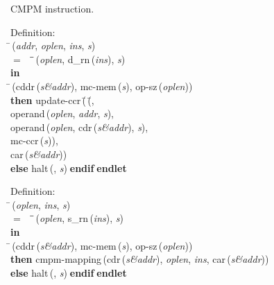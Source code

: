  CMPM instruction.
\begin{tabbing}{\sc Definition}: \\  
\=\,({\it{addr\/}}, {\it{oplen\/}}, {\it{ins\/}}, {\it{s\/}}) \\ 
$=$$\;\;\;\;$\=\=\,({\it{oplen\/}}, {\rm{d\_rn}}\,({\it{ins\/}}), {\it{s\/}})\- \\ 
{\bf in} \\ 
\=\,({\rm{cddr}}\,({\it{s\&addr\/}}), {\rm{mc-mem}}\,({\it{s\/}}), {\rm{op-sz}}\,({\it{oplen\/}})) \\ 
{\bf then }{\rm{update-ccr}}\,(\=\,(\=, \\ 
{\rm{operand}}\,({\it{oplen\/}}, {\it{addr\/}}, {\it{s\/}}), \\ 
{\rm{operand}}\,({\it{oplen\/}}, {\rm{cdr}}\,({\it{s\&addr\/}}), {\it{s\/}}), \\ 
{\rm{mc-ccr}}\,({\it{s\/}}))\-, \\ 
{\rm{car}}\,({\it{s\&addr\/}}))\- \\ 
{\bf else }{\rm{halt}}\,({}, {\it{s\/}})$\;${\bf  endif}\-$\;${\bf  endlet}\-\-
\end{tabbing}

\begin{tabbing}{\sc Definition}: \\  
\=\,({\it{oplen\/}}, {\it{ins\/}}, {\it{s\/}}) \\ 
$=$$\;\;\;\;$\=\=\,({\it{oplen\/}}, {\rm{s\_rn}}\,({\it{ins\/}}), {\it{s\/}})\- \\ 
{\bf in} \\ 
\=\,({\rm{cddr}}\,({\it{s\&addr\/}}), {\rm{mc-mem}}\,({\it{s\/}}), {\rm{op-sz}}\,({\it{oplen\/}})) \\ 
{\bf then }{\rm{cmpm-mapping}}\,({\rm{cdr}}\,({\it{s\&addr\/}}), {\it{oplen\/}}, {\it{ins\/}}, {\rm{car}}\,({\it{s\&addr\/}})) \\ 
{\bf else }{\rm{halt}}\,({}, {\it{s\/}})$\;${\bf  endif}\-$\;${\bf  endlet}\-\-
\end{tabbing}

